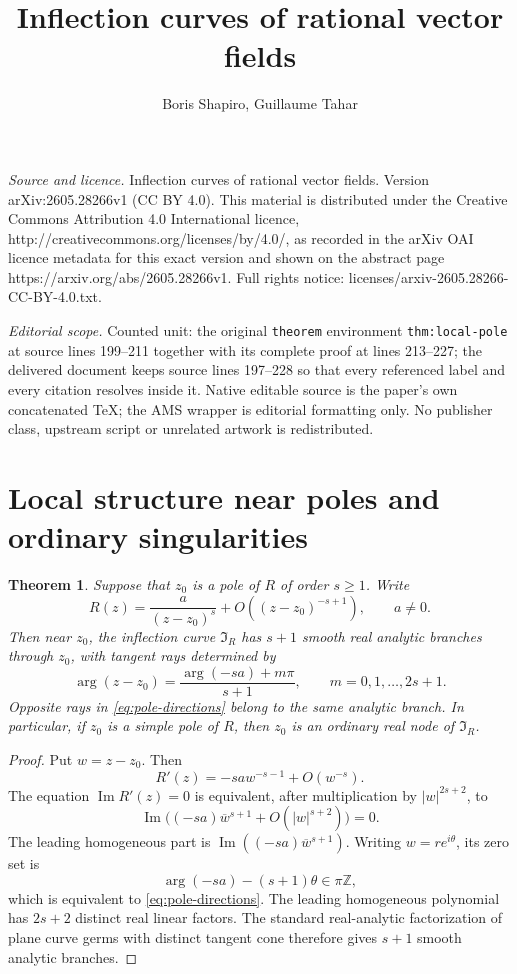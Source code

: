 \documentclass[10pt,a4paper]{amsart}
\newtheorem{theorem}{Theorem}[section]
\newcommand{\I}{\mathfrak I}
\renewcommand{\Im}{\operatorname{Im}}
\begin{document}
\title[Inflection curves of rational vector fields]{Inflection curves of rational vector fields}
\author{Boris Shapiro, Guillaume Tahar}
\date{}
\maketitle
\noindent\emph{Source and licence.} Inflection curves of rational vector fields. Version arXiv:2605.28266v1 (CC BY 4.0). This material is distributed under the Creative Commons Attribution 4.0 International licence, http://creativecommons.org/licenses/by/4.0/, as recorded in the arXiv OAI licence metadata for this exact version and shown on the abstract page https://arxiv.org/abs/2605.28266v1. Full rights notice: licenses/arxiv-2605.28266-CC-BY-4.0.txt.\par\smallskip
\noindent\textit{Editorial scope.} Counted unit: the original \texttt{theorem} environment \texttt{thm:local-pole} at source lines 199--211 together with its complete proof at lines 213--227; the delivered document keeps source lines 197--228 so that every referenced label and every citation resolves inside it. Native editable source is the paper's own concatenated TeX; the AMS wrapper is editorial formatting only. No publisher class, upstream script or unrelated artwork is redistributed.
\section{Local structure near poles and ordinary singularities}


\begin{theorem}\label{thm:local-pole}
Suppose that $z_0$ is a pole of $R$ of order $s\ge1$.  Write
\[
        R(z)=\frac{a}{(z-z_0)^s}+O((z-z_0)^{-s+1}),
        \qquad a\ne0.
\]
Then near $z_0$, the inflection curve $\I_R$ has $s+1$ smooth real analytic branches through $z_0$, with tangent rays determined by
\begin{equation}\label{eq:pole-directions}
        \arg(z-z_0)=\frac{\arg(-sa)+m\pi}{s+1},
        \qquad m=0,1,\ldots,2s+1.
\end{equation}
Opposite rays in \eqref{eq:pole-directions} belong to the same analytic branch.  In particular, if $z_0$ is a simple pole of $R$, then $z_0$ is an ordinary real node of $\I_R$.
\end{theorem}

\begin{proof}
Put $w=z-z_0$.  Then
\[
        R'(z)=-sa w^{-s-1}+O(w^{-s}).
\]
The equation $\Im R'(z)=0$ is equivalent, after multiplication by $|w|^{2s+2}$, to
\[
        \Im\bigl((-sa)\overline w^{s+1}+O(|w|^{s+2})\bigr)=0.
\]
The leading homogeneous part is $\Im((-sa)\overline w^{s+1})$.  Writing $w=re^{i\theta}$, its zero set is
\[
        \arg(-sa)-(s+1)\theta\in \pi\mathbb Z,
\]
which is equivalent to \eqref{eq:pole-directions}.  The leading homogeneous polynomial has $2s+2$ distinct real linear factors.  The standard real-analytic factorization of plane curve germs with distinct tangent cone therefore gives $s+1$ smooth analytic branches.
\end{proof}
\end{document}
